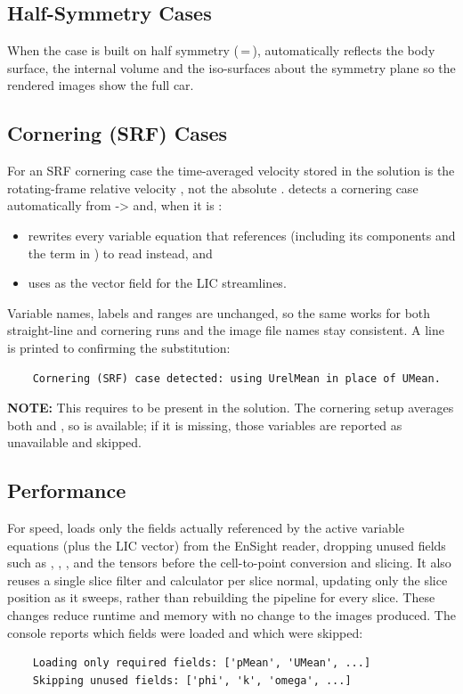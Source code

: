 \subsection{Half-Symmetry Cases}
When the case is built on half symmetry (\,=\,),  automatically reflects the body surface, the internal volume and the iso-surfaces about the symmetry plane so the rendered images show the full car.

\subsection{Cornering (SRF) Cases}
For an SRF cornering case the time-averaged velocity stored in the solution is the rotating-frame relative velocity , not the absolute .  detects a cornering case automatically from  ->  and, when it is :
\begin{itemize}
    \item rewrites every variable equation that references  (including its components  and the  term in ) to read  instead, and

    \item uses  as the vector field for the LIC streamlines.
\end{itemize}
Variable names, labels and ranges are unchanged, so the same  works for both straight-line and cornering runs and the image file names stay consistent. A line is printed to  confirming the substitution:
\begin{lstlisting}
    Cornering (SRF) case detected: using UrelMean in place of UMean.
\end{lstlisting}
\textbf{NOTE:} This requires  to be present in the solution. The cornering setup averages both  and , so  is available; if it is missing, those variables are reported as unavailable and skipped.

\subsection{Performance}
For speed,  loads only the fields actually referenced by the active variable equations (plus the LIC vector) from the EnSight reader, dropping unused fields such as , , ,  and the  tensors before the cell-to-point conversion and slicing. It also reuses a single slice filter and calculator per slice normal, updating only the slice position as it sweeps, rather than rebuilding the pipeline for every slice. These changes reduce runtime and memory with no change to the images produced. The console reports which fields were loaded and which were skipped:
\begin{lstlisting}
    Loading only required fields: ['pMean', 'UMean', ...]
    Skipping unused fields: ['phi', 'k', 'omega', ...]
\end{lstlisting}

